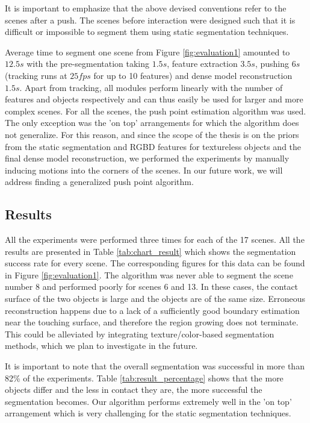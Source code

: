 It is  important to  emphasize that the above  devised conventions 
refer to  the scenes after a  push. The scenes  before interaction were
designed such that it is difficult or impossible to segment
them using static segmentation techniques.
 
Average time to segment one scene from Figure \ref{fig:evaluation1} amounted to $12.5s$ 
with the pre-segmentation taking $1.5s$, feature extraction $3.5s$, pushing 
$6s$ (tracking runs at $25fps$ for up to 10 features) and dense model reconstruction $1.5s$.
Apart from tracking, all modules perform linearly with the
number of  features and objects  respectively and can thus  easily be
used for larger and more complex  scenes. For all the scenes, the push
point estimation algorithm was used. The only exception was the 'on
top'  arrangements for which the algorithm does not generalize. 
For this reason, and since the scope of the thesis is on the priors from
the static segmentation and RGBD features for
textureless objects and the final dense model reconstruction, we performed
the experiments by manually inducing motions into the corners of the scenes.
In  our  future work, we  will address  finding a generalized  push point algorithm.
\vspace{-0.5ex}
\subsection{Results}
All  the  experiments were  performed  three  times  for each  of  the
17    scenes.    All    the    results   are    presented    in Table
\ref{tab:chart_result} which  shows the segmentation success rate  for every scene. 
The  corresponding figures for this data  can be found in  Figure \ref{fig:evaluation1}. 
The algorithm was never able to segment the scene number 8 and performed poorly for scenes
6 and 13. In these cases, the contact surface of the two objects is large and the objects are of the same size.
Erroneous reconstruction happens due to a lack of a sufficiently good boundary estimation
near the touching surface, and therefore the region growing does not terminate.
This could be alleviated by integrating texture/color-based segmentation methods,
which we plan to investigate in the future.

It  is  important to  note  that  the  overall
segmentation   was    successful   in   more   than    82\%   of   the
experiments.  Table \ref{tab:result_percentage}  shows that the more
objects differ  and the less in  contact they are,  the more successful
the  segmentation becomes.  Our
algorithm  performs extremely well in the  'on top'  arrangement which  is very
challenging for the static segmentation techniques.

